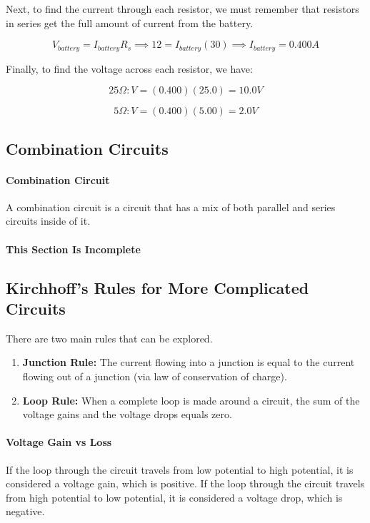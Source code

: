 \documentclass{scrartcl}
\theoremstyle{definition}
\begin{document}
	\noindent Next, to find the current through each resistor, we must remember that resistors in series get the full amount of current from the battery.
	
	$$
	V_{battery} = I_{battery} R_s \implies 12 = I_{battery} (30) \implies \boxed{I_{battery} = 0.400 A}
	$$
	
	\noindent Finally, to find the voltage across each resistor, we have:
	
	$$
	25 \Omega: V = (0.400)(25.0) = \boxed{10.0V} 
	$$
	
	$$
	5 \Omega: V = (0.400)(5.00) = \boxed{2.0 V}
	$$	
	
	\subsection{Combination Circuits}
	
	\paragraph{Combination Circuit} A combination circuit is a circuit that has a mix of both parallel and series circuits inside of it.

	\paragraph{This Section Is Incomplete}
	
	\subsection{Kirchhoff's Rules for More Complicated Circuits}
	
	\begin{theorem}
		There are two main rules that can be explored.
		\begin{enumerate}
			\item \textbf{Junction Rule: } The current flowing into a junction is equal to the current flowing out of a junction (via law of conservation of charge).
			
			\item \textbf{Loop Rule:} When a complete loop is made around a circuit, the sum of the voltage gains and the voltage drops equals zero.
		\end{enumerate}
	\end{theorem}
	
	\paragraph{Voltage Gain vs Loss} If the loop through the circuit travels from low potential to high potential, it is considered a voltage gain, which is positive. If the loop through the circuit travels from high potential to low potential, it is considered a voltage drop, which is negative.
	
\end{document}
